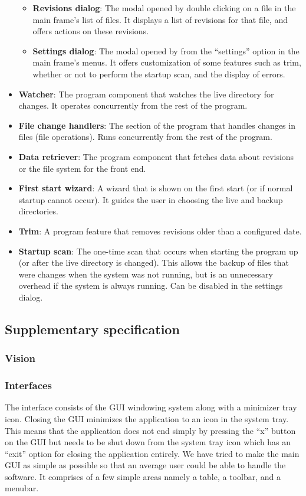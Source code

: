 \documentclass[12pt,a4paper]{article}
\newcommand\todonote[1]{{\color{red}\fbox{\parbox{\dimexpr\linewidth-2\fboxsep-2\fboxrule}{\textit\large{\textbf{TODO: #1}}}}}}
\begin{document}
\begin{itemize}
\begin{itemize}
	\item \textbf{Revisions dialog}: The modal opened by double clicking on a file in the main frame's list of files. It displays a list of revisions for that file, and offers actions on these revisions.
	\item \textbf{Settings dialog}: The modal opened by from the ``settings'' option in the main frame's menus. It offers customization of some features such as trim, whether or not to perform the startup scan, and the display of errors.
	\end{itemize}
\item \textbf{Watcher}: The program component that watches the live directory for changes. It operates concurrently from the rest of the program.
\item \textbf{File change handlers}: The section of the program that handles changes in files (file operations). Runs concurrently from the rest of the program.
\item \textbf{Data retriever}: The program component that fetches data about revisions or the file system for the front end.
\item \textbf{First start wizard}: A wizard that is shown on the first start (or if normal startup cannot occur). It guides the user in choosing the live and backup directories.
\item \textbf{Trim}: A program feature that removes revisions older than a configured date.
\item \textbf{Startup scan}: The one-time scan that occurs when starting the program up (or after the live directory is changed). This allows the backup of files that were changes when the system was not running, but is an unnecessary overhead if the system is always running. Can be disabled in the settings dialog.
\end{itemize}

\subsection{Supplementary specification}
\subsubsection{Vision}
\todonote{Done by Michael. Adapt from M4.}

\subsubsection{Interfaces}
The interface consists of the GUI windowing system along with a minimizer tray icon. Closing the GUI minimizes the application to an icon in the system tray. This means that the application does not end simply by pressing the “x” button on the GUI but needs to be shut down from the system tray icon which has an “exit” option for closing the application entirely. We have tried to make the main GUI as simple as possible so that an average user could be able to handle the software. It comprises of a few simple areas namely a table, a toolbar, and a menubar. 
\end{document}
